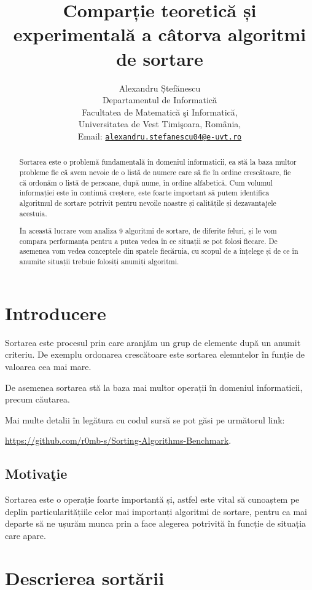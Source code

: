 \documentclass[12pt]{article}
\title{Comparție teoretică și experimentală a câtorva algoritmi de sortare}
\author{Alexandru Ștefănescu\\
Departamentul de Informatică\\
Facultatea de Matematică şi Informatică, \\
Universitatea de Vest Timişoara, România, \\
Email: \href{mailto:alexandru.stefanescu04@e-uvt.ro}{\texttt{alexandru.stefanescu04@e-uvt.ro}} \date{}
}
\begin{document}
\maketitle
\begin{abstract}
Sortarea este o problemă fundamentală în domeniul informaticii, ea stă la baza multor probleme fie că avem nevoie de o listă de numere care să fie în ordine 
crescătoare, fie că ordonăm o listă de persoane, după nume, în ordine alfabetică. Cum volumul informației este în continuă creștere, este foarte
important să putem identifica algoritmul de sortare potrivit pentru nevoile noastre și calitățile și dezavantajele acestuia.

În această lucrare vom analiza 9 algoritmi de sortare, de diferite feluri, și le vom compara performanța pentru
a putea vedea în ce situații se pot folosi fiecare. De asemenea vom vedea conceptele din spatele fiecăruia, cu scopul de a înțelege
și de ce în anumite situații trebuie folosiți anumiți algoritmi.

\end{abstract}

\pagebreak

\tableofcontents

\pagebreak

\section{Introducere}
Sortarea este procesul prin care aranjăm un grup de elemente după un anumit criteriu. De exemplu
ordonarea crescătoare este sortarea elemntelor în funție de valoarea cea mai mare.

De asemenea sortarea stă la baza mai multor operații în domeniul informaticii, precum căutarea.


Mai multe detalii în legătura cu codul sursă se pot găsi pe următorul link:

\url{https://github.com/r0mb-s/Sorting-Algorithms-Benchmark}.


\subsection{Motivaţie}

Sortarea este o operație foarte importantă și, astfel este vital să cunoaștem pe deplin particularitățiile
celor mai importanți algoritmi de sortare, pentru ca mai departe să ne ușurăm munca prin a face alegerea potrivită în funcție de situația care apare.

\section{Descrierea sortării}
\label{sec:formala}
\end{document}
